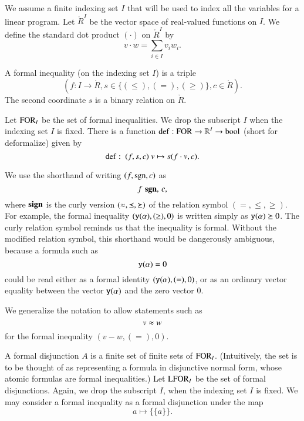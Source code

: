 We assume a finite indexing set $I$ that will be used  to index
all the variables for a linear program. Let $\ring{R}^I$ be the
vector space of real-valued functions on $I$. We define the
standard dot product $(\cdot)$ on $\ring{R}^I$ by
    $$v\cdot w = \sum_{i\in I} v_i w_i.$$

\begin{definition}
A formal inequality (on the indexing set $I$) is a triple
    $$(f:I\to\ring{R},s\in\{(\le),(=),(\ge)\},c\in\ring{R}).$$
The second coordinate $s$ is a binary relation on $\ring{R}$.
\end{definition}

Let ${\operatorname{FOR}}_I$ be the set of formal inequalities.  We drop the
subscript $I$ when the indexing set $I$ is fixed.  There is a
function ${\operatorname{def}}:{\operatorname{FOR}}\to \mathbb{R}^I \to \operatorname{bool}$ (short for
deformalize) given by
    $$\op{def}:\ (f,s,c)\ v \mapsto s(f\cdot v,c).$$

\begin{remark}
We use the shorthand of writing $(f,{\operatorname{sgn}},c)$ as
   $$f\,\,{\operatorname{{\bf sgn}}},\, c,$$
where ${\operatorname{{\bf sign}}}$ is the curly version $(\approx,\preceq,\succeq)$ of
the relation symbol $(=,\le,\ge)$. For example, the formal
inequality
    $({\operatorname{{\texttt{y}}}}(\alpha),(\ge),0)$ is written simply as ${\operatorname{{\texttt{y}}}}(\alpha)\succeq 0$.
The curly relation symbol reminds us that the inequality is
formal.  Without the modified relation symbol, this shorthand
would be dangerously ambiguous, because a formula such as
    $${\operatorname{{\texttt{y}}}}(\alpha) = 0$$
could be read either as a formal identity
$({\operatorname{{\texttt{y}}}}(\alpha),(=),0)$, or as an ordinary vector equality
between the vector ${\operatorname{{\texttt{y}}}}(\alpha)$ and the zero vector $0$.

We generalize the notation to allow statements such as
    $$v \approx w$$
for the formal inequality $(v-w,(=),0)$.
\end{remark}


\begin{definition}
A formal disjunction $A$ is a finite set of finite sets of
${\operatorname{FOR}}_I$. (Intuitively, the set is to be thought of as
representing a formula in disjunctive normal form, whose atomic
formulas are formal inequalities.) Let ${\operatorname{LFOR}}_I$ be the set of
formal disjunctions. Again, we drop the subscript $I$, when the
indexing set $I$ is fixed.  We may consider a formal inequality as
a formal disjunction under the map
    $$a \mapsto \{\{a\}\}.$$
\end{definition}

